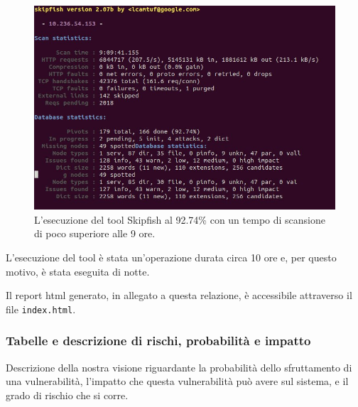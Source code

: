 \documentclass{article}
\begin{document}
\begin{itemize}
\begin{figure}[h!]
\centering
\centerline{\includegraphics[scale=0.4,keepaspectratio]{img/skipfish_run}}
\caption{L'esecuzione del tool Skipfish al 92.74\% con un tempo di scansione di poco superiore alle 9 ore.}
\end{figure}

L'esecuzione del tool è stata un'operazione durata circa 10 ore e, per questo motivo, è stata eseguita di notte.

Il report html generato, in allegato a questa relazione, è accessibile attraverso il file {\tt index.html}.
\end{itemize}

\subsubsection{Tabelle e descrizione di rischi, probabilità e impatto}
Descrizione della nostra visione riguardante la probabilità dello sfruttamento di una vulnerabilità, l'impatto che questa vulnerabilità può avere sul sistema, e il grado di rischio che si corre.
\end{document}
